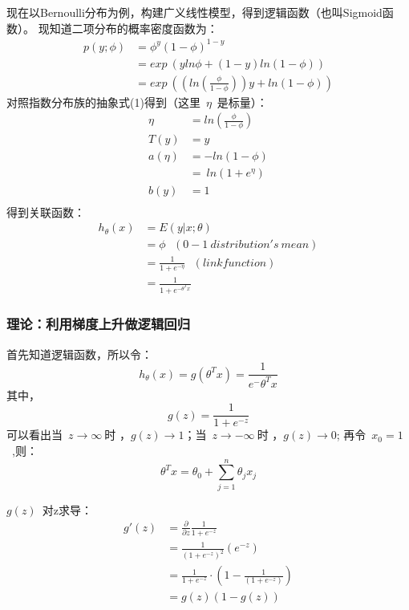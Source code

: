 现在以Bernoulli分布为例，构建广义线性模型，得到逻辑函数（也叫Sigmoid函数）。
现知道二项分布的概率密度函数为：
\begin{equation}\nonumber
\begin{split}
  p(y;\phi)&= \phi^y(1-\phi)^{1-y}\\
           &= exp~(yln\phi+(1-y)ln(1-\phi))\\
           &= exp~((ln(\frac{\phi}{1-\phi}))y+ln(1-\phi))
\end{split}
\end{equation}
对照指数分布族的抽象式(1)得到（这里~$\eta$~是标量）：
\begin{equation}\nonumber
\begin{split}
  \eta   &=ln(\frac{\phi}{1-\phi}) \\
  T(y)   &= y\\
  a(\eta)&= -ln(1-\phi)\\
         &= ~ln(1+e^\eta)\\
  b(y)   &= 1\\
\end{split}
\end{equation}
得到关联函数：
\begin{equation}\nonumber
\begin{split}
  h_\theta(x) &= E(y|x;\theta)\\
              &= \phi~~~ (0-1~distribution's~mean)\\
              &= \frac{1}{1+e^{-\eta}}~~~(link function)\\
              &= \frac{1}{1+e^{-\theta^T x}}
\end{split}
\end{equation}

\subsubsection{理论：利用梯度上升做逻辑回归}
首先知道逻辑函数，所以令：
$$h_\theta(x)=g(\theta^T x)=\frac{1}{e^-\theta^Tx}$$
其中，
$$g(z)=\frac{1}{1+e^{-z}}$$
可以看出当~$z\rightarrow\infty~$时 ，$g(z)\rightarrow1$；当~$z\rightarrow-\infty~$时 ，$g(z)\rightarrow0$;
再令~$x_0=1$~,则：
$$\theta^Tx=\theta_0+\sum_{j=1}^{n}\theta_jx_j$$

$g(z)$~对z求导：
\begin{equation}
\begin{split}
  g'(z) &= \frac{\partial}{\partial z}\frac{1}{1+e^{-z}}\\
        &= \frac{1}{(1+e^{-z})^2}(e^{-z})\\
        &= \frac{1}{1+e^{-z}}\cdot(1-\frac{1}{(1+e^{-z})})\\
        &= g(z)(1-g(z))
\end{split}
\end{equation}

